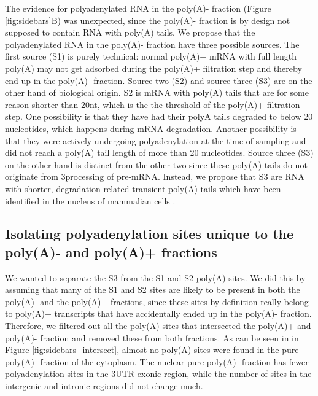 The evidence for polyadenylated RNA in the poly(A)- fraction (Figure
\ref{fig:sidebars}B) was unexpected, since the poly(A)- fraction is by design
not supposed to contain RNA with poly(A) tails. We propose that the
polyadenylated RNA in the poly(A)- fraction have three possible sources.  The
first source (S1) is purely technical: normal poly(A)+ mRNA with full length
poly(A) may not get adsorbed during the poly(A)+ filtration step and thereby
end up in the poly(A)- fraction. Source two (S2) and source three (S3) are on
the other hand of biological origin. S2 is mRNA with poly(A) tails that are for
some reason shorter than 20nt, which is the the threshold of the poly(A)+
filtration step. One possibility is that they have had their polyA tails
degraded to below 20 nucleotides, which happens during mRNA degradation.
Another possibility is that they were actively undergoing polyadenylation at
the time of sampling and did not reach a poly(A) tail length of more than 20
nucleotides. Source three (S3) on the other hand is distinct from the other
two since these poly(A) tails do not originate from 3\p processing of pre-mRNA.
Instead, we propose that S3 are RNA with shorter, degradation-related transient
poly(A) tails which have been identified in the nucleus of mammalian cells
\cite{lemay_nuclear_2010}.

\subsection{Isolating polyadenylation sites unique to the poly(A)- and poly(A)+
fractions}
We wanted to separate the S3 from the S1 and S2 poly(A) sites. We did this by
assuming that many of the S1 and S2 sites are likely to be present in both the
poly(A)- and the poly(A)+ fractions, since these sites by definition really
belong to poly(A)+ transcripts that have accidentally ended up in the poly(A)-
fraction.  Therefore, we filtered out all the poly(A) sites that intersected
the poly(A)+ and poly(A)- fraction and removed these from both fractions. As
can be seen in in Figure \ref{fig:sidebars_intersect}, almost no poly(A) sites
were found in the pure poly(A)- fraction of the cytoplasm. The nuclear pure
poly(A)- fraction has fewer polyadenylation sites in the 3\p UTR exonic region,
while the number of sites in the intergenic and intronic regions did not change
much.

